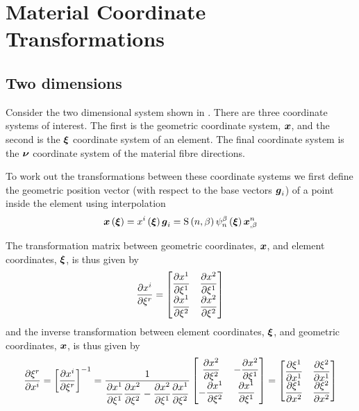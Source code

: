 \section{Material Coordinate Transformations}
\label{sec:MaterialCoordinateTransformations}

\subsection{Two dimensions}
\label{subsec:MaterialCoordinateTransformationsTwoD}

Consider the two dimensional system shown in
. There are three
coordinate systems of interest. The first is the geometric coordinate
system, $ \boldsymbol{x} $, and the second is the $ \boldsymbol{\xi} $ coordinate
system of an element. The final coordinate system is the $ \boldsymbol{\nu} $
coordinate system of the material fibre directions.


To work out the transformations between these coordinate systems we
first define the geometric position vector (with respect to the base vectors $  \boldsymbol{ g }  _{i}$) of a point inside the element
using interpolation \ie
\begin{equation}
    \boldsymbol{x} \left(  \boldsymbol{\xi}  \right) = x^{i}\left(  \boldsymbol{\xi}  \right)   \boldsymbol{ g }  _{i}=
     \mathrm{S} \left( n,\beta \right)     \psi_{n}^{\beta} \left(  \boldsymbol{\xi}  \right)    { \boldsymbol{x} }^{n} _{,\beta} 
\end{equation}

The transformation matrix between geometric coordinates, $ \boldsymbol{x} $, and element coordinates, $ \boldsymbol{\xi} $, is thus given by
\begin{equation}
  \delby{x^{i}}{\xi^{r}}=\begin{bmatrix}
  \delby{x^{1}}{\xione} & \delby{x^{2}}{\xione} \\
  \delby{x^{1}}{\xitwo} & \delby{x^{2}}{\xitwo}
  \end{bmatrix}
  \label{eqn:GeometricToElementTransformationTwoD}
\end{equation}
and the inverse transformation between element coordinates, $ \boldsymbol{\xi} $, and geometric coordinates, $ \boldsymbol{x} $, is thus given by
\begin{equation}
  \delby{\xi^{r}}{x^{i}}=\inverse{\sqbrac{\delby{x^{i}}{\xi^{r}}}}=
  \dfrac{1}{\delby{x^{1}}{\xione}\delby{x^{2}}{\xitwo}-\delby{x^{2}}{\xione}\delby{x^{1}}{\xitwo}}\begin{bmatrix}
  \delby{x^{2}}{\xitwo} & -\delby{x^{2}}{\xione} \\
  -\delby{x^{1}}{\xitwo} & \delby{x^{1}}{\xione}    
  \end{bmatrix}=\begin{bmatrix}
  \delby{\xi^{1}}{x^{1}} & \delby{\xi^{2}}{x^{1}} \\
  \delby{\xi^{1}}{x^{2}} & \delby{\xi^{2}}{x^{2}}
  \end{bmatrix}
  \label{eqn:ElementToGeometricTransformationTwoD}
\end{equation}

